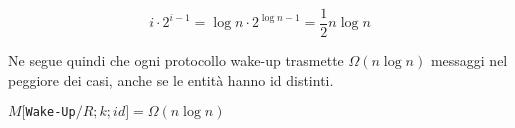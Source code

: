$$i \cdot 2^{i-1} = \log n \cdot 2^{\log n-1} = {\frac{1}{2}} n \log n$$

Ne segue quindi che ogni protocollo wake-up trasmette $\Omega(n \log n)$
messaggi nel peggiore dei casi, anche se le entità hanno id distinti.

\begin{center}
    $M[$\texttt{Wake-Up}$/R;k;id] = \Omega(n \log n)$
\end{center}




